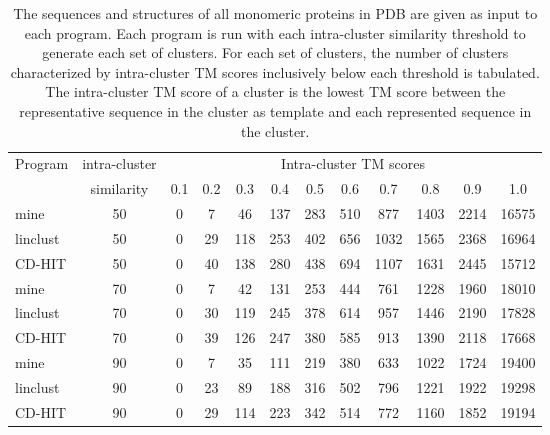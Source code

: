 \documentclass[]{article}
\begin{document}
\begin{table}%
\centering
\caption{
The sequences and structures of all monomeric proteins in PDB are given as input to each program. 
Each program is run with each intra-cluster similarity threshold to generate each set of clusters.
For each set of clusters, the number of clusters characterized by intra-cluster TM scores inclusively below each threshold is tabulated.
The intra-cluster TM score of a cluster is the lowest TM score between the representative sequence in the cluster as template and each represented sequence in the cluster.}


\begin{tabular}{l c c c c c c c c c c c}

\toprule
Program & intra-cluster & \multicolumn{10}{c}{Intra-cluster TM scores} \\
        & similarity & 0.1 & 0.2 & 0.3 & 0.4 & 0.5 & 0.6 & 0.7 & 0.8 & 0.9 & 1.0 \\
\midrule

mine     & 50 & 0 & 7 & 46 & 137 & 283 & 510 & 877 & 1403 & 2214 & 16575 \\
linclust & 50 & 0 & 29 & 118 & 253 & 402 & 656 & 1032 & 1565 & 2368 & 16964 \\
CD-HIT   & 50 & 0 & 40 & 138 & 280 & 438 & 694 & 1107 & 1631 & 2445 & 15712 \\

mine     & 70 & 0 & 7 & 42 & 131 & 253 & 444 & 761 & 1228 & 1960 & 18010 \\
linclust & 70 & 0 & 30 & 119 & 245 & 378 & 614 & 957 & 1446 & 2190 & 17828 \\
CD-HIT   & 70 & 0 & 39 & 126 & 247 & 380 & 585 & 913 & 1390 & 2118 & 17668 \\

mine     & 90 & 0 & 7 & 35 & 111 & 219 & 380 & 633 & 1022 & 1724 & 19400 \\
linclust & 90 & 0 & 23 & 89 & 188 & 316 & 502 & 796 & 1221 & 1922 & 19298 \\
CD-HIT   & 90 & 0 & 29 & 114 & 223 & 342 & 514 & 772 & 1160 & 1852 & 19194 \\

\bottomrule
\end{tabular}
\end{table}
\end{document}
